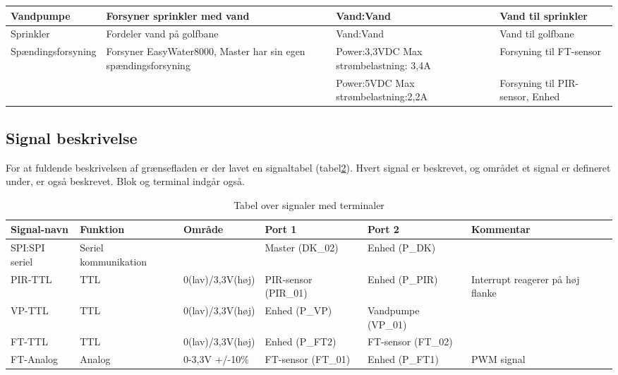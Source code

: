 \begin{table}[H]
\begin{small}
\begin{tabular}{|p{}|p{}|p{}|p{}|}
Vandpumpe & Forsyner sprinkler med vand & Vand:Vand & Vand til sprinkler \\ \hline
 
Sprinkler & Fordeler vand på golfbane & Vand:Vand & Vand til golfbane \\ \hline

Spændingsforsyning & Forsyner EasyWater8000, Master har sin egen spændingsforsyning & Power:3,3VDC \newline Max strømbelastning: 3,4A & Forsyning til FT-sensor \\ \cline{3-4}
& & Power:5VDC \newline Max strømbelastning:2,2A		& Forsyning til PIR-sensor, Enhed 	\\ \hline
\end{tabular}
\end{small}
\label{table:Bloktabel}
\end{table}

\begin{table}[H]
\subsection{Signal beskrivelse}
For at fuldende beskrivelsen af grænsefladen er der lavet en signaltabel (tabel\ref{table:Signaltabel}). Hvert signal er beskrevet, og området et signal er defineret under, er også beskrevet. Blok og terminal indgår også. 
\caption{Tabel over signaler med terminaler}
\begin{small}
\begin{tabular}{|p{2cm}|p{2cm}|p{2cm}|p{2cm}|p{2cm}|p{}|}
\hline

\textbf{Signal-navn}	&\textbf{Funktion} 		&\textbf{Område} &\textbf{Port 1} 	&\textbf{Port 2} 			&\textbf{Kommentar} \\ \hline

SPI:SPI seriel 			&Seriel kommunikation 	& 				&Master (DK\_02)		&Enhed (P\_DK)			&					 \\\hline

PIR-TTL 					&TTL 					&0(lav)\slash3,3V(høj) 	&PIR-sensor (PIR\_01) &Enhed (P\_PIR)			&Interrupt reagerer på høj flanke 					\\\hline
VP-TTL 					&TTL 					&0(lav)\slash3,3V(høj) 	&Enhed (P\_VP)  &Vandpumpe (VP\_01)				&					\\\hline
					
FT-TTL					&TTL						&0(lav)\slash3,3V(høj) 	&Enhed (P\_FT2) &FT-sensor (FT\_02)				&	    				\\\hline
FT-Analog				&Analog 					&0-3,3V 	\newline +/-10\%	&FT-sensor (FT\_01) &Enhed (P\_FT1)				& PWM signal	    				\\\hline

\end{tabular}
\end{small}
\label{table:Signaltabel}
\end{table}